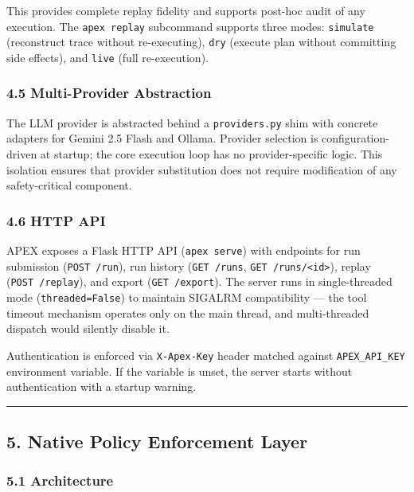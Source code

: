 \documentclass[
]{article}
\begin{document}
This provides complete replay fidelity and supports post-hoc audit of
any execution. The \texttt{apex\ replay} subcommand supports three
modes: \texttt{simulate} (reconstruct trace without re-executing),
\texttt{dry} (execute plan without committing side effects), and
\texttt{live} (full re-execution).

\subsubsection{4.5 Multi-Provider
Abstraction}\label{45-multi-provider-abstraction}

The LLM provider is abstracted behind a \texttt{providers.py} shim with
concrete adapters for Gemini 2.5 Flash and Ollama. Provider selection is
configuration-driven at startup; the core execution loop has no
provider-specific logic. This isolation ensures that provider
substitution does not require modification of any safety-critical
component.

\subsubsection{4.6 HTTP API}\label{46-http-api}

APEX exposes a Flask HTTP API (\texttt{apex\ serve}) with endpoints for
run submission (\texttt{POST\ /run}), run history (\texttt{GET\ /runs},
\texttt{GET\ /runs/\textless{}id\textgreater{}}), replay
(\texttt{POST\ /replay}), and export (\texttt{GET\ /export}). The server
runs in single-threaded mode (\texttt{threaded=False}) to maintain
SIGALRM compatibility --- the tool timeout mechanism operates only on
the main thread, and multi-threaded dispatch would silently disable it.

Authentication is enforced via \texttt{X-Apex-Key} header matched
against \texttt{APEX\_API\_KEY} environment variable. If the variable is
unset, the server starts without authentication with a startup warning.

\begin{center}\rule{0.5\linewidth}{0.5pt}\end{center}

\subsection{5. Native Policy Enforcement Layer}\label{5-native-policy-enforcement-layer}

\subsubsection{5.1 Architecture}\label{51-architecture}
\end{document}
